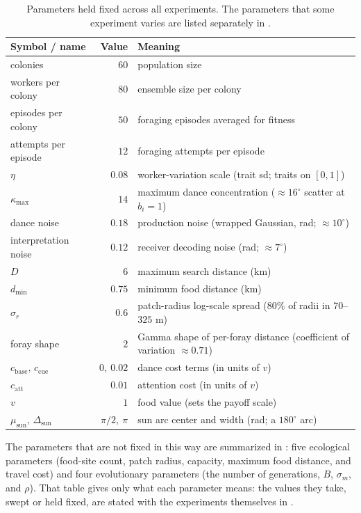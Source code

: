 \documentclass[11pt]{article}
\begin{document}
\begin{table}
  \centering
  \small
  \begin{tabular}{@{}lr p{}@{}}
    \toprule
    Symbol / name & Value & Meaning \\
    \midrule
    colonies & $60$ & population size \\
    workers per colony & $80$ & ensemble size per colony \\
    episodes per colony & $50$ & foraging episodes averaged for fitness \\
    attempts per episode & $12$ & foraging attempts per episode \\
    $\eta$ & $0.08$ & worker-variation scale (trait sd; traits on $[0,1]$) \\
    $\kappa_{\max}$ & $14$ & maximum dance concentration ($\approx 16^\circ$ scatter at $b_i = 1$) \\
    dance noise & $0.18$ & production noise (wrapped Gaussian, rad; $\approx 10^\circ$) \\
    interpretation noise & $0.12$ & receiver decoding noise (rad; $\approx 7^\circ$) \\
    $D$ & $6$ & maximum search distance (km) \\
    $d_{\min}$ & $0.75$ & minimum food distance (km) \\
    $\sigma_r$ & $0.6$ & patch-radius log-scale spread ($80\%$ of radii in $70$--$325$ m) \\
    foray shape & $2$ & Gamma shape of per-foray distance (coefficient of variation $\approx 0.71$) \\
    $c_{\mathrm{base}},\,c_{\mathrm{cue}}$ & $0,\ 0.02$ & dance cost terms (in units of $v$) \\
    $c_{\mathrm{att}}$ & $0.01$ & attention cost (in units of $v$) \\
    $v$ & $1$ & food value (sets the payoff scale) \\
    $\mu_{\mathrm{sun}},\,\Delta_{\mathrm{sun}}$ & $\pi/2,\ \pi$ & sun arc center and width (rad; a $180^\circ$ arc) \\
    \bottomrule
  \end{tabular}
  \caption{Parameters held fixed across all experiments. The parameters that some
    experiment varies are listed separately in .}
  \label{tab:fixed-params}
\end{table}

The parameters that are not fixed in this way are summarized in
: five ecological parameters (food-site count, patch
radius, capacity, maximum food distance, and travel cost) and four evolutionary
parameters (the number of generations, $B$, $\sigma_m$, and $\rho$). That table
gives only what each parameter means: the values they take, swept or held fixed,
are stated with the experiments themselves in
.
\end{document}
